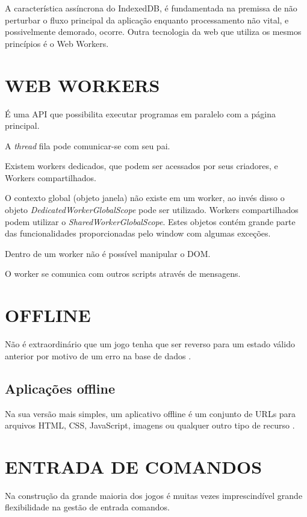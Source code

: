 
A característica assíncrona do IndexedDB, é fundamentada na
premissa de não perturbar o fluxo principal da aplicação enquanto
processamento não vital, e possivelmente demorado, ocorre. Outra
tecnologia da web que utiliza os mesmos princípios é o Web Workers.

\section{WEB WORKERS}
É uma API que possibilita executar programas em paralelo com a página principal.

A \textit{thread} fila pode comunicar-se com seu pai.

Existem workers dedicados, que podem ser acessados por seus criadores, e Workers
compartilhados.

O contexto global (objeto janela) não existe em um worker, ao invés disso
o objeto \textit{DedicatedWorkerGlobalScope} pode ser utilizado.
Workers compartilhados podem utilizar o \textit{SharedWorkerGlobalScope}.
Estes objetos contém grande parte das funcionalidades proporcionadas pelo window
com algumas exceções.

Dentro de um worker não é possível manipular o DOM.

O worker se comunica com outros scripts através de mensagens.

\section{OFFLINE}

Não é extraordinário que um jogo tenha que ser reverso para um estado
válido anterior por motivo de um erro na base de dados \autocite[pp.
5]{browserGamesTechnologyAndFuture}.

\subsection{Aplicações offline}
Na sua versão mais simples, um aplicativo offline é um conjunto de
URLs para arquivos HTML, CSS, JavaScript, imagens ou qualquer outro tipo
de recurso \autocite{diveIntohtml}.

\section{ENTRADA DE COMANDOS}
Na construção da grande maioria dos jogos é muitas vezes
imprescindível grande flexibilidade na gestão de entrada comandos.

